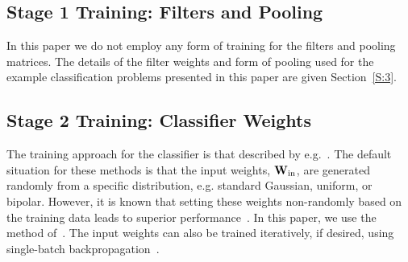 \documentclass[conference]{IEEEtran}
\begin{document}
\subsection{Stage 1 Training: Filters and Pooling}

In this paper we do not employ any form of training for the filters and pooling matrices. The details of the filter weights and form of pooling used for the example classification problems presented in this paper are given Section~\ref{S:3}.

\subsection{Stage 2 Training: Classifier Weights}

The  training approach for the classifier is that described by  e.g.~\cite{Schmidt.92,Chen.96,Eliasmith,Huang.14}. The default situation for these methods is that the input weights, ${\bf W}_{\rm in}$, are generated randomly from a specific distribution, e.g. standard Gaussian, uniform, or bipolar. However, it is known that setting these weights non-randomly based on the training data leads to superior performance~\cite{McDonnell.15PLOS,Tapson.14,Zhu.15}. In this paper, we use the method of~\cite{Zhu.15}.  The input weights can also be trained iteratively, if desired, using single-batch  backpropagation~\cite{Yu.12}.
\end{document}

